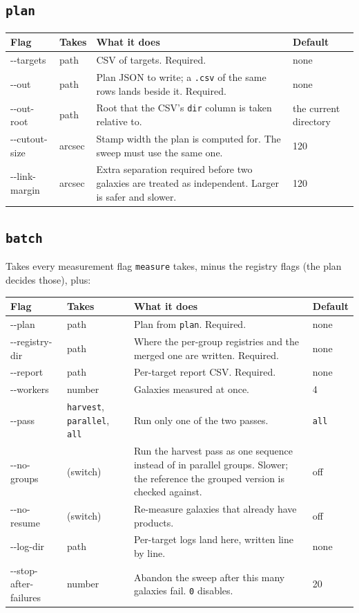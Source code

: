 \documentclass[11pt]{article}
\begin{document}
\subsection{\texttt{plan}}

\begin{longtable}{T{2.9cm} L{2.15cm} L{6.45cm} L{2.7cm}}
\toprule
\textbf{\normalfont Flag} & \textbf{Takes} & \textbf{What it does} & \textbf{Default} \\
\midrule
\endhead
-{}-targets & path & CSV of targets. Required. & none \\[2pt]
-{}-out & path & Plan JSON to write; a \texttt{.csv} of the same rows
  lands beside it. Required. & none \\[2pt]
-{}-out-root & path & Root that the CSV's \texttt{dir} column is taken
  relative to. & the current directory \\[2pt]
-{}-cutout-size & arcsec & Stamp width the plan is computed for. The sweep
  must use the same one. & 120 \\[2pt]
-{}-link-margin & arcsec & Extra separation required before two galaxies
  are treated as independent. Larger is safer and slower. & 120 \\
\bottomrule
\end{longtable}

\subsection{\texttt{batch}}

Takes every measurement flag \texttt{measure} takes, minus the registry
flags (the plan decides those), plus:

\begin{longtable}{T{2.9cm} L{2.15cm} L{6.45cm} L{2.7cm}}
\toprule
\textbf{\normalfont Flag} & \textbf{Takes} & \textbf{What it does} & \textbf{Default} \\
\midrule
\endhead
-{}-plan & path & Plan from \texttt{plan}. Required. & none \\[2pt]
-{}-registry-dir & path & Where the per-group registries and the merged
  one are written. Required. & none \\[2pt]
-{}-report & path & Per-target report CSV. Required. & none \\[2pt]
-{}-workers & number & Galaxies measured at once. & 4 \\[2pt]
-{}-pass & \texttt{harvest}, \texttt{parallel}, \texttt{all} & Run only one
  of the two passes. & \texttt{all} \\[2pt]
-{}-no-groups & (switch) & Run the harvest pass as one sequence instead of
  in parallel groups. Slower; the reference the grouped version is checked
  against. & off \\[2pt]
-{}-no-resume & (switch) & Re-measure galaxies that already have products.
  & off \\[2pt]
-{}-log-dir & path & Per-target logs land here, written line by line. &
  none \\[2pt]
-{}-stop-after-failures & number & Abandon the sweep after this many
  galaxies fail. \texttt{0} disables. & 20 \\
\bottomrule
\end{longtable}
\end{document}
